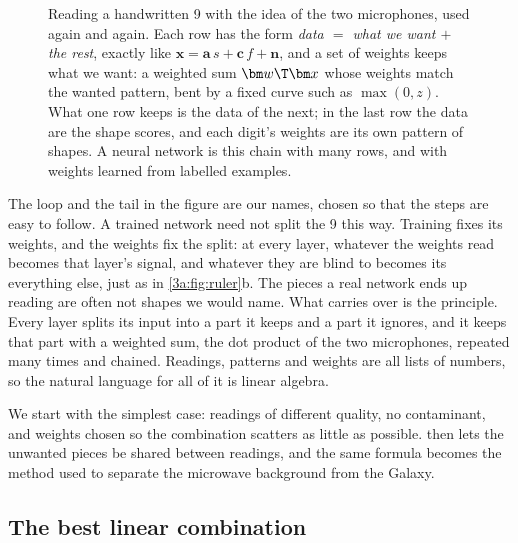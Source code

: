 \begin{figure}[htbp]
\caption{Reading a handwritten 9 with the idea of the two microphones, used again and again. Each row
has the form \emph{data $=$ what we want $+$ the rest}, exactly like $\bm x=\bm a\,s+\bm c\,f+\bm n$,
and a set of weights keeps what we want: a weighted sum $\bm w\T\bm x$ whose weights match the wanted
pattern, bent by a fixed curve such as $\max(0,z)$. What one row keeps is the data of the next; in the
last row the data are the shape scores, and each digit's weights are its own pattern of shapes. A
neural network is this chain with many rows, and with weights learned from labelled examples.}
\label{3a:fig:network}
\end{figure}

The loop and the tail in the figure are our names, chosen so that the steps
are easy to follow. A trained network need not split the 9 this way. Training
fixes its weights, and the weights fix the split: at every layer, whatever the
weights read becomes that layer's signal, and whatever they are blind to
becomes its everything else, just as in \cref{3a:fig:ruler}b. The pieces a
real network ends up reading are often not shapes we would name. What carries
over is the principle. Every layer splits its input into a part it keeps and a
part it ignores, and it keeps that part with a weighted sum, the dot product of
the two microphones, repeated many times and chained. Readings, patterns and
weights are all lists of numbers, so the natural language for all of it is
linear algebra.

We start with the simplest case: readings of different quality, no
contaminant, and weights chosen so the combination scatters as little as
possible.  then lets the unwanted pieces be
shared between readings, and the same formula becomes the method used to
separate the microwave background from the Galaxy.

\subsection{The best linear combination}
\label{3a:sec:blue}

